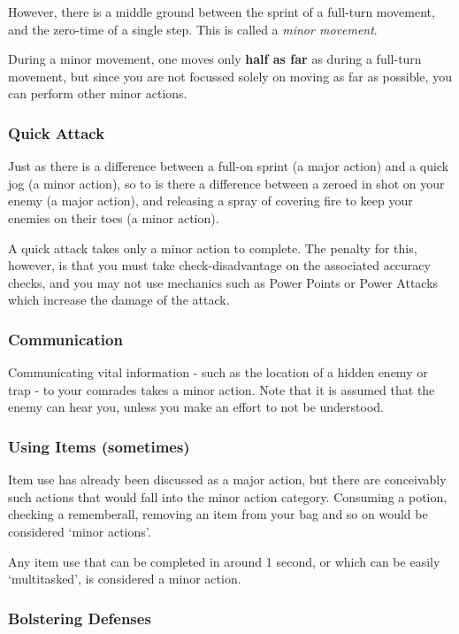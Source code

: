 However, there is a middle ground between the sprint of a full-turn movement, and the zero-time of a single step. This is called a {\it minor movement}. 

During a minor movement, one moves only {\bf half as far} as during a full-turn movement, but since you are not focussed solely on moving as far as possible, you can perform other minor actions. 

\subsubsection{Quick Attack}

Just as there is a difference between a full-on sprint (a major action) and a quick jog (a minor action), so to is there a difference between a zeroed in shot on your enemy (a major action), and releasing a spray of covering fire to keep your enemies on their toes (a minor action). 

A quick attack takes only a minor action to complete. The penalty for this, however, is that you must take check-disadvantage on the associated accuracy checks, and you may not use mechanics such as Power Points or Power Attacks which increase the damage of the attack. 


\subsubsection{Communication}

Communicating vital information - such as the location of a hidden enemy or trap - to your comrades takes a minor action. Note that it is assumed that the enemy can hear you, unless you make an effort to not be understood. 

\subsubsection{Using Items (sometimes)}

Item use has already been discussed as a major action, but there are conceivably such actions that would fall into the minor action category. Consuming a potion, checking a rememberall, removing an item from your bag and so on would be considered `minor actions'. 

Any item use that can be completed in around 1 second, or which can be easily `multitasked', is considered a minor action. 

\subsubsection{Bolstering Defenses}
 
